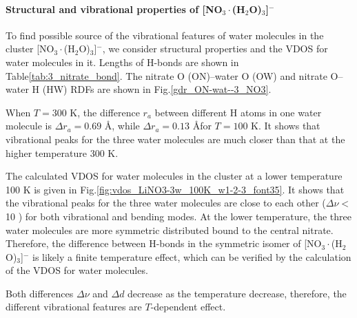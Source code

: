 \paragraph{Structural and vibrational properties of [NO$_3\cdot$(H$_2$O)$_3$]$^-$}
To find possible source of the vibrational features of water molecules in the 
cluster [NO$_3\cdot$(H$_2$O)$_3$]$^-$, we consider structural properties and the VDOS for water molecules 
in it. 
Lengths of H-bonds are shown in Table\thinspace\ref{tab:3_nitrate_bond}. 
The nitrate O (ON)--water O (OW) 
and nitrate O--water H (HW) RDFs are shown in Fig.\thinspace\ref{gdr_ON-wat--3_NO3}.

%
When $T=300$ K, the difference $r_a$ between different H atoms in one water molecule is
$\Delta{r_a}=0.69$ \AA, while $\Delta{r_a}=0.13$ \AA for $T=100$ K. It shows that vibrational 
peaks for the three water molecules are much closer than that at the higher temperature 300 K. 

%
The calculated VDOS for water molecules in the cluster at a lower temperature 100 K is given in 
Fig.\thinspace\ref{fig:vdos_LiNO3-3w_100K_w1-2-3_font35}. 
It shows that the vibrational peaks for the three water molecules 
are close to each other ($\Delta\nu <$ 10 \cm) for both vibrational and bending modes.
At the lower temperature, the three water molecules 
are more symmetric distributed bound to the central nitrate. Therefore, the difference between H-bonds in the 
symmetric isomer of [NO$_3\cdot$(H$_2$O)$_3$]$^-$ is likely a finite temperature effect,
which can be verified by the calculation of the VDOS for water molecules.

%
Both differences $\Delta\nu$ and $\Delta{d}$ decrease as the temperature decrease,
therefore, the different vibrational features are $T$-dependent effect. 


